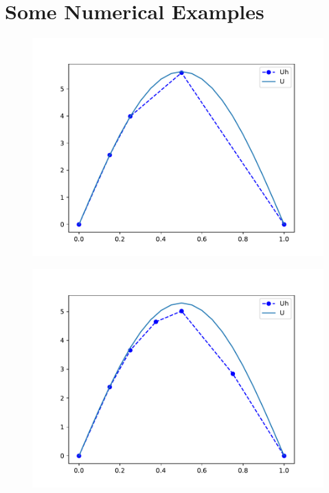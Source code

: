 \documentclass{uonmathreport}
\theoremstyle{definition}
\theoremstyle{problem}
\theoremstyle{theorem}
\begin{document}
\clearpage

\section{Some Numerical Examples} \label{sec:Examples}

\begin{figure}[h!]
\begin{minipage}{0.49\hsize}
   \includegraphics[width=1.1\textwidth]{adap1_time_1.pdf}
  \end{minipage}
  \hfill
    \begin{minipage}{0.49\hsize}
    \vspace{5mm}
    \includegraphics[width=1.1\textwidth]{adap1_time_2.pdf}
  \label{fig:c}
\end{minipage}
    \end{figure}
    
\end{document}
